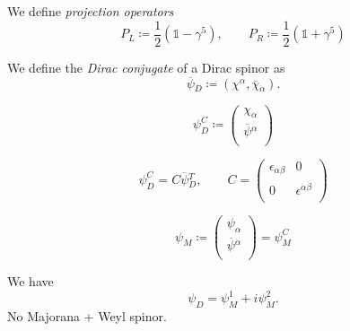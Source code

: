 \begin{definition}
  We define \emph{projection operators}
  \begin{equation}
    P_L \coloneqq \frac{1}{2} (\mathbb{1} - \gamma^5), \qquad 
    P_R \coloneqq \frac{1}{2} (\mathbb{1} + \gamma^5)
  \end{equation}
\end{definition}
\begin{definition}
  We define the \emph{Dirac conjugate} of a Dirac spinor as
  \begin{equation}
    \overline{\psi}{}_D \coloneqq (\chi^{\alpha}, \overline{\chi}{}_{\dot\alpha}).
  \end{equation}
\end{definition}
\begin{definition}[]
  \begin{equation}
    \psi_D^C \coloneqq 
    \begin{pmatrix}
    \chi_{\alpha} \\
    \overline{\psi}{}^{\dot\alpha} \\
    \end{pmatrix}
  \end{equation}
\end{definition}
\begin{claim}
  \begin{equation}
    \psi_D^C = C \overline{\psi}{}_D^T, \qquad
    C = 
    \begin{pmatrix}
     \epsilon_{\alpha\beta} & 0 \\
     0 & \epsilon^{\dot\alpha\dot\beta} \\
    \end{pmatrix}
  \end{equation}
\end{claim}

\begin{definition}
  \begin{equation}
    \psi_M \coloneqq 
    \begin{pmatrix}
    \psi_{\alpha} \\
    \overline{\psi}{}^{\dot\alpha} \\
    \end{pmatrix}
    = \psi_M^C
  \end{equation}
\end{definition}
We have
\begin{equation}
  \psi_D = \psi^1_M + i \psi_M^2.
\end{equation}
No Majorana + Weyl spinor.
